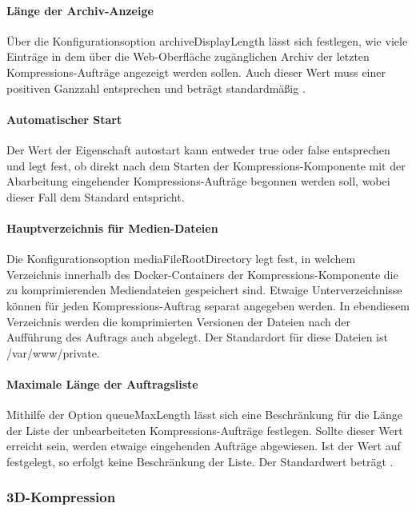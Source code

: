 \paragraph{Länge der Archiv-Anzeige} Über die Konfigurationsoption {\ttfamily archive\-Display\-Leng\-th} lässt sich festlegen, wie viele Einträge in dem über die Web-Oberfläche zugänglichen Archiv der letzten Kompressions-Aufträge angezeigt werden sollen. Auch dieser Wert muss einer positiven Ganzzahl entsprechen und beträgt standardmäßig {}.

\paragraph{Automatischer Start} Der Wert der Eigenschaft {\ttfamily autostart} kann entweder {\ttfamily true} oder {\ttfamily false} entsprechen und legt fest, ob direkt nach dem Starten der Kompressions-Komponente mit der Abarbeitung eingehender Kompressions-Aufträge begonnen werden soll, wobei dieser Fall dem Standard entspricht.

\paragraph{Hauptverzeichnis für Medien-Dateien} Die Konfigurationsoption {\ttfamily media\-File\-Root\-Directory} legt fest, in welchem Verzeichnis innerhalb des Docker-Containers der Kompressions-Komponente die zu komprimierenden Mediendateien gespeichert sind. Etwaige Unterverzeichnisse können für jeden Kompressions-Auftrag separat angegeben werden. In ebendiesem Verzeichnis werden die komprimierten Versionen der Dateien nach der Aufführung des Auftrags auch abgelegt. Der Standardort für diese Dateien ist {\ttfamily /var/www/private}.

\paragraph{Maximale Länge der Auftragsliste} Mithilfe der Option {\ttfamily queueMaxLength} lässt sich eine Beschränkung für die Länge der Liste der unbearbeiteten Kompressions-Aufträge festlegen. Sollte dieser Wert erreicht sein, werden etwaige eingehenden Aufträge abgewiesen. Ist der Wert auf {} festgelegt, so erfolgt keine Beschränkung der Liste. Der Standardwert beträgt {}.


\subsubsection{3D-Kompression}

